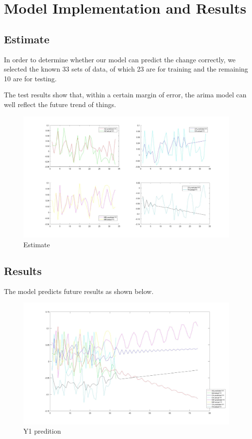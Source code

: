 \documentclass{mcmthesis}
\begin{document}
\section{Model Implementation and Results}

    \subsection{Estimate}

        In order to determine whether our model can predict the change correctly, we selected the known 33 sets of data, of which 23 are for training and the remaining 10 are for testing.

        The test results show that, within a certain margin of error, the arima model can well reflect the future trend of things.

        \begin{figure}[!hbpt]
            \centering
            \includegraphics[width=450px]{estimate.jpg}
            \caption{Estimate}
        \end{figure}

    \subsection{Results}

        The model predicts future results as shown below.

        \begin{figure}[!hbpt]
          \centering
          \includegraphics[width=450px]{Y1.jpg}
          \caption{Y1 predition}
        \end{figure}
\end{document}
